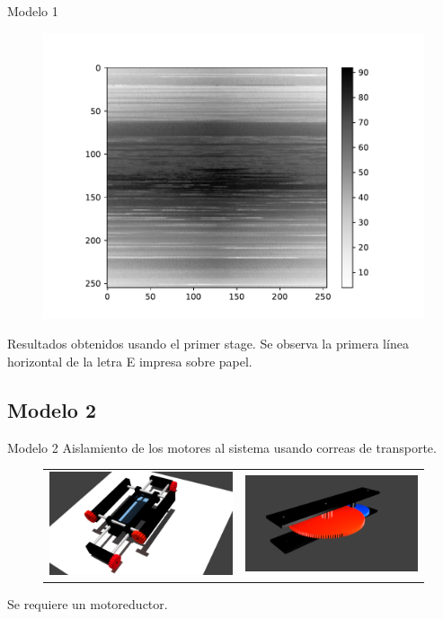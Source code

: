 \documentclass{beamer}
\begin{document}
    \begin{frame}{Modelo 1}
    	\begin{figure}[h]
    		\centering
    		\includegraphics[width=0.62\linewidth]{figures/complete.pdf}
    	\end{figure}
    	Resultados obtenidos usando el primer stage. Se observa la primera línea horizontal de la letra E impresa sobre papel.
    \end{frame}
    
	\subsection{Modelo 2}
    \begin{frame}{Modelo 2}
    	Aislamiento de los motores al sistema usando correas de transporte.
        \begin{figure}[h]
        	\centering
        	\begin{tabular}{cc}
        		\includegraphics[width=0.45\linewidth]{figures/system2.jpg} & 
        		\includegraphics[width=0.45\linewidth]{figures/model2.png}
        	\end{tabular}
        \end{figure}
        Se requiere un motoreductor.
    \end{frame}
    
\end{document}
